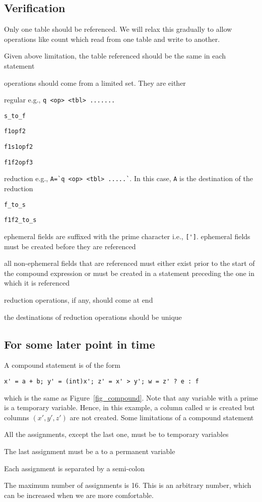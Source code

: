 \documentclass{report}
\begin{document}
\subsection{Verification}
\be
\item Only one table should be referenced. We will relax this gradually
to allow operations like count which read from one table and write to
another. 
\item Given above limitation, the table referenced should be the same in
each statement 
\item operations should come from a limited set. They are either 
\be
\item regular e.g., \verb+q <op> <tbl> .......+
\be
\item \verb+s_to_f+
\item \verb+f1opf2+
\item \verb+f1s1opf2+
\item \verb+f1f2opf3+
\ee
\item reduction e.g., \verb+A=`q <op> <tbl> .....`+. In this case,
{\tt A} is the destination of the reduction 
\be
\item \verb+f_to_s+
\item \verb+f1f2_to_s+
\ee
\ee
\item ephemeral fields are suffixed with the prime character i.e.,
  \verb+[']+. ephemeral fields must be created before they are referenced 
\item all non-ephemeral fields that are referenced must either exist
prior to the start of the compound expression or must be created in a
statement preceding the one in which it is referenced
\item reduction operations, if any, should come at end
\item the destinations of reduction operations should be unique
\ee



\subsection{For some later point in time}

A compound statement is of the form
\begin{verbatim}
x' = a + b; y' = (int)x'; z' = x' > y'; w = z' ? e : f
\end{verbatim}
which is the same as Figure~\ref{fig_compound}. Note that any variable
with a prime is a temporary variable. Hence, in this example, a column
called \(w\) is created but columns \((x', y', z')\) are not created.
Some limitations of a compound statement
\be
\item All the assignments, except the last one, must be to temporary
variables
\item The last assignment must be a to a permanent variable
\item Each assignment is separated by a semi-colon
\item The maximum number of assignments is 16. This is an arbitrary
number, which can be increased when we are more comfortable.
\ee
\end{document}
